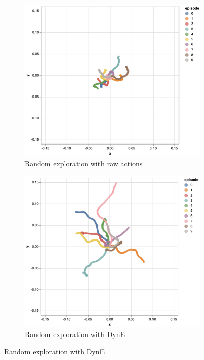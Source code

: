 \begin{figure}[h]
\centering
\begin{subfigure}[t]{0.45\textwidth}
    \includegraphics[width=\textwidth]{figures/dyne/explore_random.png}
    \caption{Random exploration with raw actions}
\end{subfigure}
\begin{subfigure}[t]{0.45\textwidth}
    \includegraphics[width=\textwidth]{figures/dyne/explore_sto.png}
    \caption{Random exploration with DynE}

\end{subfigure}
\end{figure}

